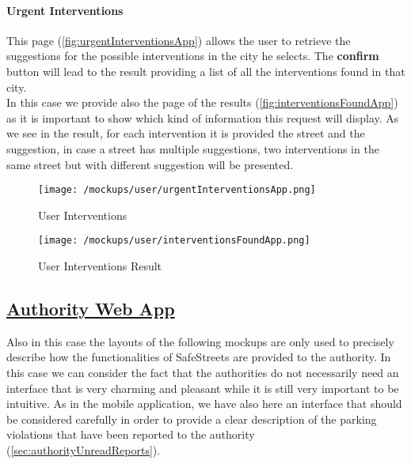 			\paragraph{Urgent Interventions}
			This page (\autoref{fig:urgentInterventionsApp}) allows the user to retrieve the suggestions for the possible interventions in the city he selects. The \textbf{confirm} button will lead to the result providing a list of all the interventions found in that city.\\
			
			In this case we provide also the page of the results (\autoref{fig:interventionsFoundApp}) as it is important to show which kind of information this request will display. As we see in the result, for each intervention it is provided the street and the suggestion, in case a street has multiple suggestions, two interventions in the same street but with different suggestion will be presented.
			
			\vspace{0.6cm}
			
			\begin{figure}[ht!]
				\centering
				\begin{minipage}{0.5\textwidth}
					\centering
					\texttt{[image: /mockups/user/urgentInterventionsApp.png]}
					\caption{\label{fig:urgentInterventionsApp} User Interventions}
				\end{minipage}\hfill
				\begin{minipage}{0.5\textwidth}
					\centering
					\texttt{[image: /mockups/user/interventionsFoundApp.png]}
					\caption{\label{fig:interventionsFoundApp} User Interventions Result}
				\end{minipage}
			\end{figure}
		
		\subsection[Authority Web App]{\hyperlink{toc}{Authority Web App}}
			\label{sec:authorityWebApp}
			
			Also in this case the layouts of the following mockups are only used to precisely describe how the functionalities of SafeStreets are provided to the authority. In this case we can consider the fact that the authorities do not necessarily need an interface that is very charming and pleasant while it is still very important to be intuitive. As in the mobile application, we have also here an interface that should be considered carefully in order to provide a clear description of the parking violations that have been reported to the authority (\autoref{sec:authorityUnreadReports}).
			

